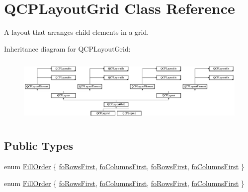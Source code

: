 \hypertarget{class_q_c_p_layout_grid}{}\section{Q\+C\+P\+Layout\+Grid Class Reference}
\label{class_q_c_p_layout_grid}


A layout that arranges child elements in a grid.  


Inheritance diagram for Q\+C\+P\+Layout\+Grid\+:\begin{figure}[H]
\begin{center}
\leavevmode
\includegraphics[height=3.255814cm]{class_q_c_p_layout_grid}
\end{center}
\end{figure}
\subsection*{Public Types}
\begin{DoxyCompactItemize}
\item 
enum \hyperlink{class_q_c_p_layout_grid_a7d49ee08773de6b2fd246edfed353cca}{Fill\+Order} \{ \hyperlink{class_q_c_p_layout_grid_a7d49ee08773de6b2fd246edfed353ccaa727502c945b524b47b6a727429ecc198}{fo\+Rows\+First}, 
\hyperlink{class_q_c_p_layout_grid_a7d49ee08773de6b2fd246edfed353ccaab17e416e3f51ccb897694a3aec6b86b8}{fo\+Columns\+First}, 
\hyperlink{class_q_c_p_layout_grid_a7d49ee08773de6b2fd246edfed353ccaa727502c945b524b47b6a727429ecc198}{fo\+Rows\+First}, 
\hyperlink{class_q_c_p_layout_grid_a7d49ee08773de6b2fd246edfed353ccaab17e416e3f51ccb897694a3aec6b86b8}{fo\+Columns\+First}
 \}
\item 
enum \hyperlink{class_q_c_p_layout_grid_a7d49ee08773de6b2fd246edfed353cca}{Fill\+Order} \{ \hyperlink{class_q_c_p_layout_grid_a7d49ee08773de6b2fd246edfed353ccaa727502c945b524b47b6a727429ecc198}{fo\+Rows\+First}, 
\hyperlink{class_q_c_p_layout_grid_a7d49ee08773de6b2fd246edfed353ccaab17e416e3f51ccb897694a3aec6b86b8}{fo\+Columns\+First}, 
\hyperlink{class_q_c_p_layout_grid_a7d49ee08773de6b2fd246edfed353ccaa727502c945b524b47b6a727429ecc198}{fo\+Rows\+First}, 
\hyperlink{class_q_c_p_layout_grid_a7d49ee08773de6b2fd246edfed353ccaab17e416e3f51ccb897694a3aec6b86b8}{fo\+Columns\+First}
 \}
\end{DoxyCompactItemize}

